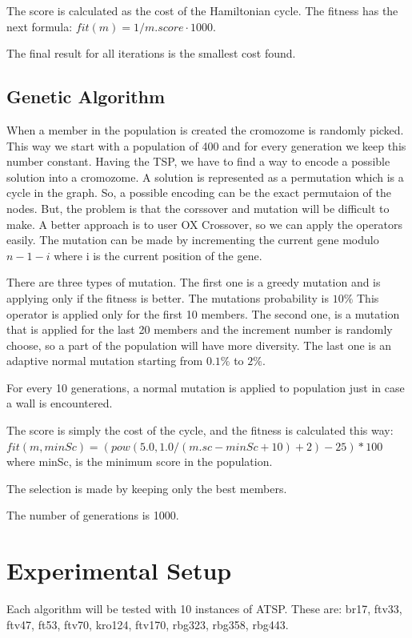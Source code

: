 \documentclass[12pt,leqno]{article}
\begin{document}
    The score is calculated as the cost of the Hamiltonian cycle. The fitness has the next formula: $fit(m) = 1 / m.score \cdot 1000$.
    
    The final result for all iterations is the smallest cost found.

  \subsection{Genetic Algorithm}
    When a member in the population is created the cromozome is randomly picked. This way
    we start with a population of 400 and for every generation we keep this number constant.
    Having the TSP, we have to find a way to encode a possible solution into a cromozome.
    A solution is represented as a permutation which is a cycle in the graph.
    So, a possible encoding can be the exact permutaion of the nodes. But, the problem is that 
    the corssover and mutation will be difficult to make.
    A better approach is to user OX Crossover, so we can apply the operators easily.
    The mutation can be made by incrementing the current gene modulo $n - 1 - i$ where i is the current position of the gene.
    
    There are three types of mutation. The first one is a greedy mutation and is applying 
    only if the fitness is better. The mutations probability is $10\%$ This operator is applied only for the first 10 members.
    The second one, is a mutation that is applied for the last 20 members and the increment number
    is randomly choose, so a part of the population will have more diversity. The last one is an adaptive normal mutation
    starting from $0.1\%$ to $2\%$.

    For every 10 generations, a normal mutation is applied to population just in case a wall is encountered.

    The score is simply the cost of the cycle, and the fitness is calculated this way: 
    $fit(m, minSc) = (pow(5.0, 1.0 / (m.sc - minSc + 10) + 2) - 25) * 100$ 
    where minSc, is the minimum score in the population.

    The selection is made by keeping only the best members.

    The number of generations is 1000.


\section{Experimental Setup}
  Each algorithm will be tested with 10 instances of ATSP. These are: br17, ftv33, ftv47, ft53, ftv70, kro124, ftv170, rbg323, rbg358, rbg443.
\end{document}
